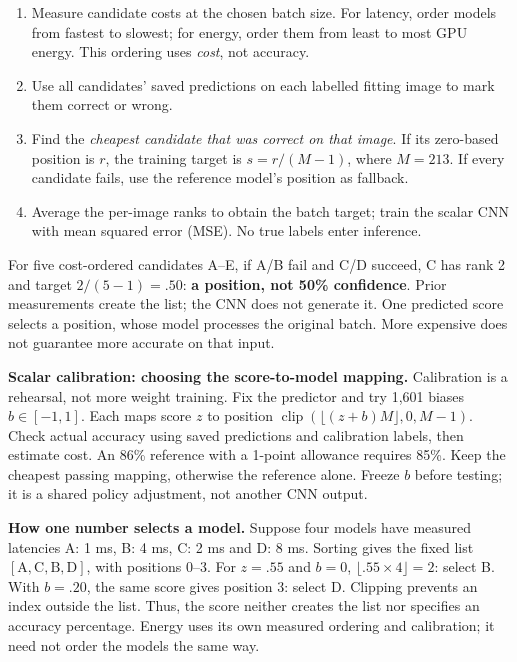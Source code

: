 \documentclass[10pt,a4paper]{article}
\begin{document}
\begin{enumerate}[leftmargin=1.5em,itemsep=.15em,topsep=.2em]
\item Measure candidate costs at the chosen batch size. For latency, order models from fastest to slowest; for energy, order them from least to most GPU energy. This ordering uses \emph{cost}, not accuracy.
\item Use all candidates' saved predictions on each labelled fitting image to mark them correct or wrong.
\item Find the \emph{cheapest candidate that was correct on that image}. If its zero-based position is $r$, the training target is $s=r/(M-1)$, where $M=213$. If every candidate fails, use the reference model's position as fallback.
\item Average the per-image ranks to obtain the batch target; train the scalar CNN with mean squared error (MSE). No true labels enter inference.
\end{enumerate}
For five cost-ordered candidates A--E, if A/B fail and C/D succeed, C has rank 2 and target $2/(5-1)=.50$: \textbf{a position, not 50\% confidence}. Prior measurements create the list; the CNN does not generate it. One predicted score selects a position, whose model processes the original batch. More expensive does not guarantee more accurate on that input.

\textbf{Scalar calibration: choosing the score-to-model mapping.} Calibration is a rehearsal, not more weight training. Fix the predictor and try 1,601 biases $b\in[-1,1]$. Each maps score $z$ to position $\operatorname{clip}(\lfloor(z+b)M\rfloor,0,M-1)$. Check actual accuracy using saved predictions and calibration labels, then estimate cost. An 86\% reference with a 1-point allowance requires 85\%. Keep the cheapest passing mapping, otherwise the reference alone. Freeze $b$ before testing; it is a shared policy adjustment, not another CNN output.

\textbf{How one number selects a model.} Suppose four models have measured latencies A: 1 ms, B: 4 ms, C: 2 ms and D: 8 ms. Sorting gives the fixed list $[\mathrm{A},\mathrm{C},\mathrm{B},\mathrm{D}]$, with positions 0--3. For $z=.55$ and $b=0$, $\lfloor .55\times4\rfloor=2$: select B. With $b=.20$, the same score gives position 3: select D. Clipping prevents an index outside the list. Thus, the score neither creates the list nor specifies an accuracy percentage. Energy uses its own measured ordering and calibration; it need not order the models the same way.
\end{document}
